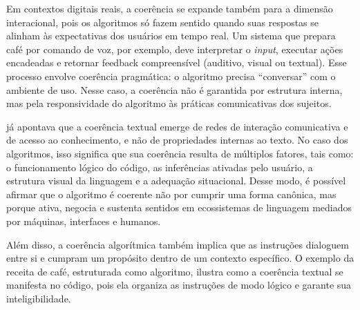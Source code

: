 \documentclass[portuguese]{textolivre}
\begin{document}
Em contextos digitais reais, a coerência se expande também para a dimensão interacional, pois os algoritmos só fazem sentido quando suas respostas se alinham às expectativas dos usuários em tempo real. Um sistema que prepara café por comando de voz, por exemplo, deve interpretar o \textit{input}, executar ações encadeadas e retornar feedback compreensível (auditivo, visual ou textual). Esse processo envolve coerência pragmática: o algoritmo precisa “conversar” com o ambiente de uso. Nesse caso, a coerência não é garantida por estrutura interna, mas pela responsividade do algoritmo às práticas comunicativas dos sujeitos.

\textcite{beaugrande1997} já apontava que a coerência textual emerge de redes de interação comunicativa e de acesso ao conhecimento, e não de propriedades internas ao texto. No caso dos algoritmos, isso significa que sua coerência resulta de múltiplos fatores, tais como: o funcionamento lógico do código, as inferências ativadas pelo usuário, a estrutura visual da linguagem e a adequação situacional. Desse modo, é possível afirmar que o algoritmo é coerente não por cumprir uma forma canônica, mas porque ativa, negocia e sustenta sentidos em ecossistemas de linguagem mediados por máquinas, interfaces e humanos.

Além disso, a coerência algorítmica também implica que as instruções dialoguem entre si e cumpram um propósito dentro de um contexto específico. O exemplo da receita de café, estruturada como algoritmo, ilustra como a coerência textual se manifesta no código, pois ela organiza as instruções de modo lógico e garante sua inteligibilidade.
\end{document}
